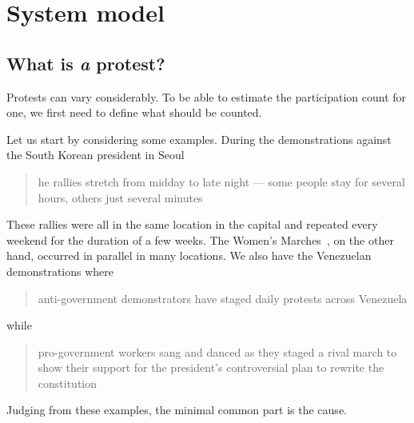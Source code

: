 \mode*

\section{System model}%
\label{SystemModel}

\subsection{What is \protect\emph{a} protest?}%
\label{WhatIsAProtest}

Protests can vary considerably.
To be able to estimate the participation count for one, we first need to define
what should be counted.

Let us start by considering some examples.
During the demonstrations against the South Korean president in Seoul
\blockcquote{2016DemonstrationsInSeoul}{%
  he rallies stretch from midday to late night --- some 
  people stay for several hours, others just several minutes%
}.
These rallies were all in the same location in the capital and repeated every 
weekend for the duration of a few weeks.
The Women's Marches~\cite{2017WomensMarchesInUS}, on the other hand, occurred 
in parallel in many locations.
We also have the Venezuelan demonstrations where
\blockcquote{2017VenezuelaProtestFrequency}{%
  anti-government demonstrators have staged daily protests across Venezuela%
} while
\blockcquote{AlJazeeraOnVenezuela2017}{%
  pro-government workers sang and danced as they staged a rival march to show 
  their support for the president's controversial plan to rewrite the 
  constitution%
}.
Judging from these examples, the minimal common part is the cause.


